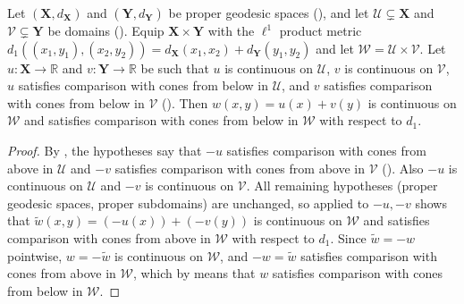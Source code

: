 \begin{corollary}
Let $(\mathbf X,d_{\mathbf X})$ and $(\mathbf Y,d_{\mathbf Y})$ be proper geodesic spaces (), and let $\mathcal U\subsetneq\mathbf X$ and $\mathcal V\subsetneq\mathbf Y$ be domains (). Equip $\mathbf X\times\mathbf Y$ with the $\ell^1$ product metric $d_1((x_1,y_1),(x_2,y_2))=d_{\mathbf X}(x_1,x_2)+d_{\mathbf Y}(y_1,y_2)$ and let $\mathcal W=\mathcal U\times\mathcal V$. Let $u:\mathbf X\to\mathbb R$ and $v:\mathbf Y\to\mathbb R$ be such that $u$ is continuous on $\mathcal U$, $v$ is continuous on $\mathcal V$, $u$ satisfies comparison with cones from below in $\mathcal U$, and $v$ satisfies comparison with cones from below in $\mathcal V$ (). Then $w(x,y)=u(x)+v(y)$ is continuous on $\mathcal W$ and satisfies comparison with cones from below in $\mathcal W$ with respect to $d_1$.
\end{corollary}
\begin{proof}
By , the hypotheses say that $-u$ satisfies comparison with cones from above in $\mathcal U$ and $-v$ satisfies comparison with cones from above in $\mathcal V$ (). Also $-u$ is continuous on $\mathcal U$ and $-v$ is continuous on $\mathcal V$. All remaining hypotheses (proper geodesic spaces, proper subdomains) are unchanged, so  applied to $-u,-v$ shows that $\tilde w(x,y)=(-u(x))+(-v(y))$ is continuous on $\mathcal W$ and satisfies comparison with cones from above in $\mathcal W$ with respect to $d_1$. Since $\tilde w=-w$ pointwise, $w=-\tilde w$ is continuous on $\mathcal W$, and $-w=\tilde w$ satisfies comparison with cones from above in $\mathcal W$, which by  means that $w$ satisfies comparison with cones from below in $\mathcal W$.
\end{proof}
